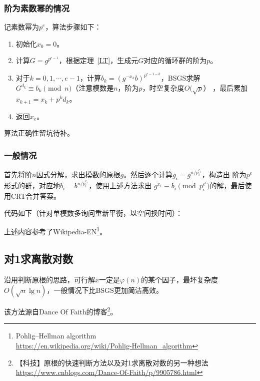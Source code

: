 \subsubsection{阶为素数幂的情况}

记素数幂为$p^e$，算法步骤如下：

\begin{enumerate}
    \item 初始化$x_0=0$。
    \item 计算$G=g^{p^{e-1}}$，根据定理~\ref{LT}，生成元$G$对应的循环群的阶为$p$。
    \item 对于$k=0,1,\cdots,e-1$，计算$b_k=(g^{-x_k}b)^{p^{e-1-k}}$，BSGS求解
    $G^{d_k}\equiv b_k\pmod{n}$（注意模数是$n$，阶为$p$，时空复杂度$O(\sqrt{p}$）
    ，最后累加$x_{k+1}=x_k+p^kd_k$。
    \item 返回$x_e$。
\end{enumerate}

算法正确性留坑待补。

\subsubsection{一般情况}
首先将阶$n$因式分解，求出模数的原根$g$。然后逐个计算$g_i=g^{n/p_i^{e_i}}$，构造出
阶为$p^e$形式的群，对应地$b_i=b^{n/p_i^{e_i}}$，使用上述方法求出
$g^{x_i}\equiv b_i\pmod{p_i^{e^i}}$的解，最后使用CRT合并答案。

代码如下（针对单模数多询问重新平衡，以空间换时间）：


上述内容参考了Wikipedia-EN\footnote{
    Pohlig–Hellman algorithm\\
    \url{https://en.wikipedia.org/wiki/Pohlig-Hellman\_algorithm}
}。
\subsection{对1求离散对数}
沿用判断原根的思路，可行解$x$一定是$\varphi(n)$的某个因子，最坏复杂度
$O(\sqrt{n}\lg n)$，一般情况下比BSGS更加简洁高效。

该方法源自Dance Of Faith的博客\footnote{
    【科技】原根的快速判断方法以及对1求离散对数的另一种想法%
    \url{https://www.cnblogs.com/Dance-Of-Faith/p/9905786.html}
}。
